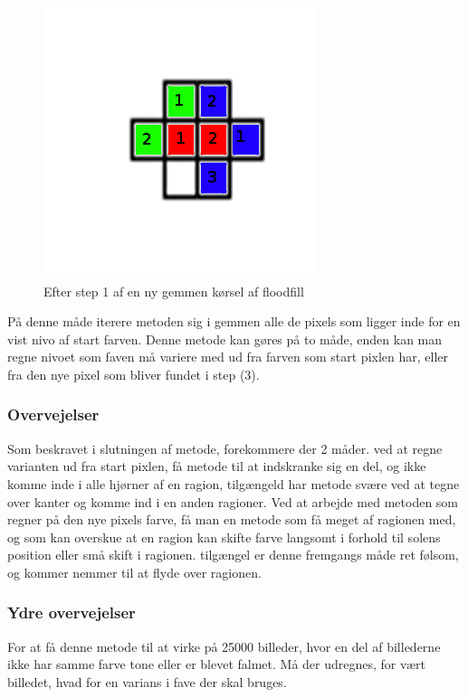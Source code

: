 \begin{figure}[h]
	\begin{center}
		\includegraphics[scale=0.42,angle=0]{afsnit/vores_implementation/billeder/flood_fill/floodfill4}
	\end{center}
	\caption[]{Efter step 1 af en ny gemmen kørsel af floodfill}
	\label{floodfill4}
\end{figure}

På denne måde iterere metoden sig i gemmen alle de pixels som ligger
inde for en vist nivo af start farven. Denne metode kan gøres på to
måde, enden kan man regne nivoet som faven må variere med ud fra farven
som start pixlen har, eller fra den nye pixel som bliver fundet i step
(3).

\subsubsection*{Overvejelser}
Som beskravet i slutningen af metode, forekommere der 2 måder. ved at
regne varianten ud fra start pixlen, få metode til at indskranke sig en
del, og ikke komme inde i alle hjørner af en ragion, tilgængeld har
metode svære ved at tegne over kanter og komme ind i en anden ragioner.
Ved at arbejde med metoden som regner på den nye pixels farve, få man en
metode som få meget af ragionen med, og som kan overskue at en ragion
kan skifte farve langsomt i forhold til solens position eller små skift
i ragionen. tilgængel er denne fremgangs måde ret følsom, og kommer
nemmer til at flyde over ragionen.

\subsubsection*{Ydre overvejelser}
For at få denne metode til at virke på 25000 billeder, hvor en del af
billederne ikke har samme farve tone eller er blevet falmet. Må der
udregnes, for vært billedet, hvad for en varians i fave der skal bruges.
